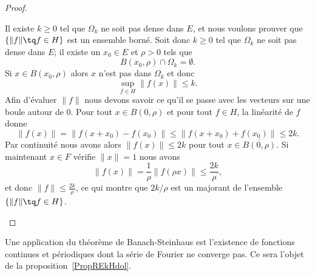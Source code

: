\begin{proof}
\begin{subproof}
            Il existe \( k\geq 0\) tel que \( \Omega_k\) ne soit pas dense dans \( E\), et nous voulons prouver que \( \{ \| f \|\tq f\in H \}\) est un ensemble borné. Soit donc \( k\geq 0\) tel que \( \Omega_k\) ne soit pas dense dans \( E\); il existe un \( x_0\in E\) et \( \rho>0\) tels que
            \begin{equation}
                B(x_0,\rho)\cap \Omega_k=\emptyset.
            \end{equation}
            Si \( x\in B(x_0,\rho)\) alors \( x\) n'est pas dans \( \Omega_k\) et donc
            \begin{equation}
                \sup_{f\in H}\| f(x) \|\leq k.
            \end{equation}
            Afin d'évaluer \( \| f \|\) nous devons savoir ce qu'il se passe avec les vecteurs sur une boule autour de \( 0\). Pour tout \( x\in B(0,\rho)\) et pour tout \( f\in H\), la linéarité de \( f\) donne
            \begin{equation}
                \| f(x) \|=\| f(x+x_0)-f(x_0) \|\leq \| f(x+x_0)+f(x_0) \|\leq 2k.
            \end{equation}
            Par continuité nous avons alors \( \| f(x) \|\leq 2k\) pour tout \( x\in \overline{ B(0,\rho) }\). Si maintenant \( x\in F\) vérifie \( \| x \|=1\) nous avons
            \begin{equation}
                \| f(x) \|=\frac{1}{ \rho }\| f(\rho x) \|\leq \frac{ 2k }{ \rho },
            \end{equation}
            et donc \( \| f \|\leq \frac{ 2k }{ \rho }\), ce qui montre que \( 2k/\rho\) est un majorant de l'ensemble \( \{ \| f \|\tq f\in H \}\).

    \end{subproof}

\end{proof}
Une application du théorème de Banach-Steinhaus est l'existence de fonctions continues et périodiques dont la série de Fourier ne converge pas. Ce sera l'objet de la proposition~\ref{PropREkHdol}.

